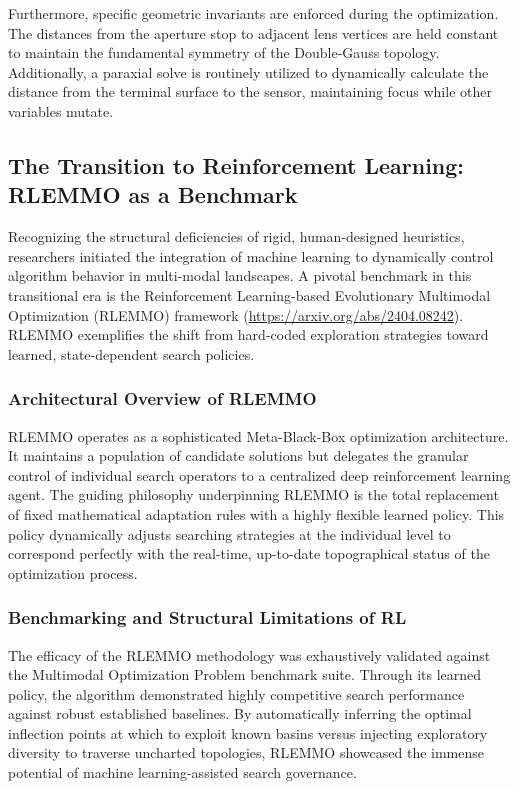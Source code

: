 \documentclass[12pt]{article}
\begin{document}
Furthermore, specific geometric invariants are enforced during the optimization. The distances from the aperture stop to adjacent lens vertices are held constant to maintain the fundamental symmetry of the Double-Gauss topology. Additionally, a paraxial solve is routinely utilized to dynamically calculate the distance from the terminal surface to the sensor, maintaining focus while other variables mutate.


\subsection{The Transition to Reinforcement Learning: RLEMMO as a Benchmark}
Recognizing the structural deficiencies of rigid, human-designed heuristics, researchers initiated the integration of machine learning to dynamically control algorithm behavior in multi-modal landscapes. A pivotal benchmark in this transitional era is the Reinforcement Learning-based Evolutionary Multimodal Optimization (RLEMMO) framework (\url{https://arxiv.org/abs/2404.08242}). RLEMMO exemplifies the shift from hard-coded exploration strategies toward learned, state-dependent search policies.

\subsubsection{Architectural Overview of RLEMMO}
RLEMMO operates as a sophisticated Meta-Black-Box optimization architecture. It maintains a population of candidate solutions but delegates the granular control of individual search operators to a centralized deep reinforcement learning agent. The guiding philosophy underpinning RLEMMO is the total replacement of fixed mathematical adaptation rules with a highly flexible learned policy. This policy dynamically adjusts searching strategies at the individual level to correspond perfectly with the real-time, up-to-date topographical status of the optimization process.

\subsubsection{Benchmarking and Structural Limitations of RL}
The efficacy of the RLEMMO methodology was exhaustively validated against the Multimodal Optimization Problem benchmark suite. Through its learned policy, the algorithm demonstrated highly competitive search performance against robust established baselines. By automatically inferring the optimal inflection points at which to exploit known basins versus injecting exploratory diversity to traverse uncharted topologies, RLEMMO showcased the immense potential of machine learning-assisted search governance.
\end{document}
